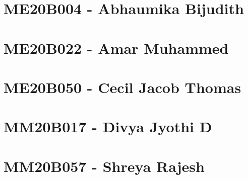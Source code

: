\documentclass[12pt]{article}
\begin{document}
\newpage

\tableofcontents

\newpage

\section{ME20B004 - Abhaumika Bijudith}

\newline
\section{ME20B022 - Amar Muhammed}

\newline

\section{ME20B050 - Cecil Jacob Thomas}


\section{MM20B017 - Divya Jyothi D}

\newpage

\section{MM20B057 - Shreya Rajesh}


\newpage



\end{document}
